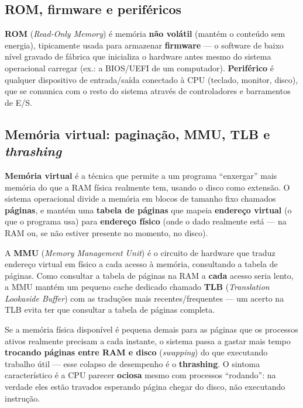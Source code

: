 \subsection{ROM, firmware e periféricos}

\begin{conceito}
\textbf{ROM} (\textit{Read-Only Memory}) é memória \textbf{não volátil}
(mantém o conteúdo sem energia), tipicamente usada para armazenar
\textbf{firmware} --- o software de baixo nível gravado de fábrica que
inicializa o hardware antes mesmo do sistema operacional carregar (ex.: a
BIOS/UEFI de um computador). \textbf{Periférico} é qualquer dispositivo de
entrada/saída conectado à CPU (teclado, monitor, disco), que se comunica
com o resto do sistema através de controladores e barramentos de E/S.
\end{conceito}

\subsection{Memória virtual: paginação, MMU, TLB e \textit{thrashing}}

\begin{conceito}
\textbf{Memória virtual} é a técnica que permite a um programa “enxergar”
mais memória do que a RAM física realmente tem, usando o disco como
extensão. O sistema operacional divide a memória em blocos de tamanho fixo
chamados \textbf{páginas}, e mantém uma \textbf{tabela de páginas} que
mapeia \textbf{endereço virtual} (o que o programa usa) para
\textbf{endereço físico} (onde o dado realmente está --- na RAM ou, se não
estiver presente no momento, no disco).
\end{conceito}

\begin{conceito}
A \textbf{MMU} (\textit{Memory Management Unit}) é o circuito de hardware
que traduz endereço virtual em físico a cada acesso à memória, consultando
a tabela de páginas. Como consultar a tabela de páginas na RAM a
\textbf{cada} acesso seria lento, a MMU mantém um pequeno cache dedicado
chamado \textbf{TLB} (\textit{Translation Lookaside Buffer}) com as
traduções mais recentes/frequentes --- um acerto na TLB evita ter que
consultar a tabela de páginas completa.
\end{conceito}

\begin{conceito}
Se a memória física disponível é pequena demais para as páginas que os
processos ativos realmente precisam a cada instante, o sistema passa a
gastar mais tempo \textbf{trocando páginas entre RAM e disco}
(\textit{swapping}) do que executando trabalho útil --- esse colapso de
desempenho é o \textbf{thrashing}. O sintoma característico é a CPU parecer
\textbf{ociosa} mesmo com processos “rodando”: na verdade eles estão
travados esperando página chegar do disco, não executando instrução.
\end{conceito}

